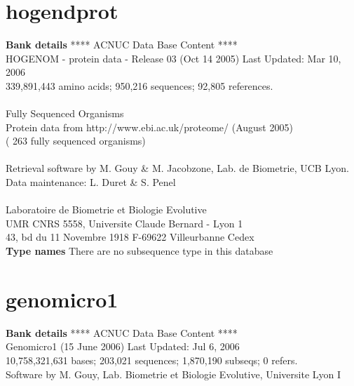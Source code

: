 \documentclass{article}
\begin{document}
\begin{Schunk}
\section{ hogendprot }
\textbf{Bank details}
               ****     ACNUC Data Base Content      ****                      \\
  HOGENOM - protein data - Release 03 (Oct 14 2005) Last Updated: Mar 10, 2006\\
          339,891,443 amino acids; 950,216 sequences; 92,805 references.\\
                                                                               \\
                        Fully Sequenced Organisms\\
   Protein data from http://www.ebi.ac.uk/proteome/ (August 2005)\\
	            ( 263 fully sequenced organisms)\\
\\
Retrieval software by M. Gouy \& M. Jacobzone, Lab. de Biometrie, UCB Lyon.\\
Data maintenance: L. Duret \& S. Penel\\
\\
Laboratoire de Biometrie et Biologie Evolutive\\
UMR CNRS 5558, Universite Claude Bernard - Lyon 1 \\
43, bd du 11 Novembre 1918 F-69622 Villeurbanne Cedex\\


\textbf{Type names}
There are no subsequence type in this database
\section{ genomicro1 }
\textbf{Bank details}
             ****     ACNUC Data Base Content      ****                         \\
              Genomicro1 (15 June 2006) Last Updated: Jul  6, 2006\\
10,758,321,631 bases; 203,021 sequences; 1,870,190 subseqs; 0 refers.\\
Software by M. Gouy, Lab. Biometrie et Biologie Evolutive, Universite Lyon I 


\end{Schunk}
\end{document}
